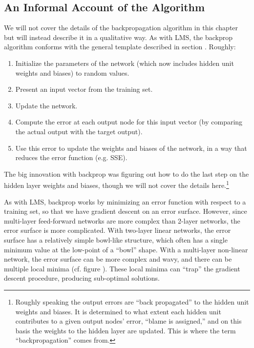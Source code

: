 \subsection{An Informal Account of the Algorithm}


We will not cover the details of the backpropagation algorithm in this chapter but will instead describe it in a qualitative way. As with LMS, the backprop algorithm conforms with the general template described in section . Roughly:
\begin{enumerate}
\item Initialize the parameters of the network (which now includes hidden unit weights and biases) to random values.
\item Present an input vector from the training set.
\item Update the network.
\item Compute the error at each output node for this input vector (by comparing the actual output with the target output).
\item Use this error to update the weights and biases of the network, in a way that reduces the error function (e.g. SSE).
\end{enumerate}

The big innovation with backprop was figuring out how to do the last step on the hidden layer weights and biases, though we will not cover the details here.\footnote{Roughly speaking the output errors are ``back propagated'' to the hidden unit weights and biases. It is determined to what extent each hidden unit contributes to a given output nodes' error, ``blame is assigned,'' and on this basis the weights to the hidden layer are updated. This is where the term ``backpropagation'' comes from.}  

As with LMS, backprop works by minimizing an error function with respect to a training set, so that we have gradient descent on an error surface. However, since multi-layer feed-forward networks are more complex than 2-layer networks, the error surface is more complicated. With two-layer linear networks, the error surface has a relatively simple bowl-like structure, which often has a single minimum value at the low-point of a ``bowl'' shape. With a multi-layer non-linear network, the error surface can be more complex and wavy, and there can be multiple local minima (cf. figure ). These local minima can ``trap'' the gradient descent procedure, producing sub-optimal solutions.

